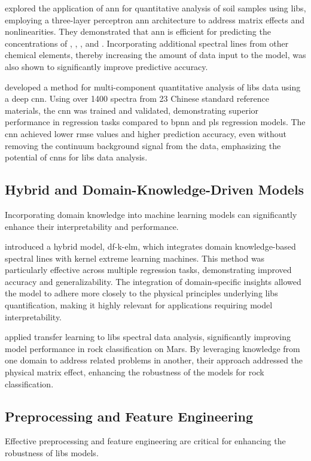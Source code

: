 \citet{el_haddad_ann_2013} explored the application of \gls{ann} for quantitative analysis of soil samples using \gls{libs}, employing a three-layer perceptron \gls{ann} architecture to address matrix effects and nonlinearities.
They demonstrated that \gls{ann} is efficient for predicting the concentrations of , , , and .
Incorporating additional spectral lines from other chemical elements, thereby increasing the amount of data input to the model, was also shown to significantly improve predictive accuracy.

\citet{li2020cnn} developed a method for multi-component quantitative analysis of \gls{libs} data using a deep \gls{cnn}.
Using over 1400 spectra from 23 Chinese standard reference materials, the \gls{cnn} was trained and validated, demonstrating superior performance in regression tasks compared to \gls{bpnn} and \gls{pls} regression models.
The \gls{cnn} achieved lower \gls{rmse} values and higher prediction accuracy, even without removing the continuum background signal from the data, emphasizing the potential of \gls{cnn}s for \gls{libs} data analysis.

\subsection{Hybrid and Domain-Knowledge-Driven Models}
Incorporating domain knowledge into machine learning models can significantly enhance their interpretability and performance.

\citet{song_DF-K-ELM} introduced a hybrid model, \gls{df}-\gls{k-elm}, which integrates domain knowledge-based spectral lines with kernel extreme learning machines.
This method was particularly effective across multiple regression tasks, demonstrating improved accuracy and generalizability.
The integration of domain-specific insights allowed the model to adhere more closely to the physical principles underlying \gls{libs} quantification, making it highly relevant for applications requiring model interpretability.

\citet{sunMachineLearningTransfer2021} applied transfer learning to \gls{libs} spectral data analysis, significantly improving model performance in rock classification on Mars.
By leveraging knowledge from one domain to address related problems in another, their approach addressed the physical matrix effect, enhancing the robustness of the models for rock classification.

\subsection{Preprocessing and Feature Engineering}
Effective preprocessing and feature engineering are critical for enhancing the robustness of \gls{libs} models.

